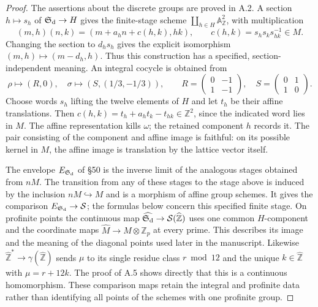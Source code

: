 \begin{proof}
The assertions about the discrete groups are proved in A.2. A section
$h\mapsto s_h$ of $\mathfrak S_{\rm d}\to H$ gives the finite-stage
scheme $\coprod_{h\in H}\mathbb A^2_{\mathbb Z}$, with multiplication
\[
 (m,h)(n,k)=(m+a_hn+c(h,k),hk),\qquad
 c(h,k)=s_hs_ks_{hk}^{-1}\in M.
\]
Changing the section to $d_hs_h$ gives the explicit isomorphism
$(m,h)\mapsto(m-d_h,h)$. Thus this construction has a specified,
section-independent meaning. An integral cocycle is obtained from
\[
 \rho\longmapsto(R,0),\quad
 \sigma\longmapsto(S,(1/3,-1/3)),\qquad
 R=\begin{pmatrix}0&-1\\1&-1\end{pmatrix},\quad
 S=\begin{pmatrix}0&1\\1&0\end{pmatrix}.
\]
Choose words $s_h$ lifting the twelve elements of $H$ and let $t_h$ be
their affine translations. Then
$c(h,k)=t_h+a_ht_k-t_{hk}\in\mathbb Z^2$, since the indicated word lies
in $M$. The affine representation kills $\omega$; the retained component
$h$ records it. The pair consisting of the component and affine image is
faithful: on its possible kernel in $M$, the affine image is translation
by the lattice vector itself.

The envelope $E_{\mathfrak S_{\rm d}}$ of \S50 is the inverse limit of
the analogous stages obtained from $nM$. The transition from any of
these stages to the stage above is induced by the inclusion
$nM\hookrightarrow M$ and is a morphism of affine group schemes.
It gives the comparison $E_{\mathfrak S_{\rm d}}\to\mathcal S$; the
formulas below concern this specified finite stage. On profinite
points the continuous map
$\widehat{\mathfrak S_{\rm d}}\to\mathcal S(\widehat{\mathbb Z})$
uses one common $H$-component and the coordinate maps
$\widehat M\to M\otimes\mathbb Z_p$ at every prime. This describes its
image and the meaning of the diagonal points used later in the
manuscript. Likewise $\widehat{\mathbb Z}^{*}\to\gamma(\widehat{\mathbb Z})$
sends $\mu$ to its single residue class $r\bmod12$ and the unique
$k\in\widehat{\mathbb Z}$ with $\mu=r+12k$. The proof of A.5 shows
directly that this is a continuous homomorphism. These comparison maps
retain the integral and profinite data rather than identifying all
points of the schemes with one profinite group.
\end{proof}

